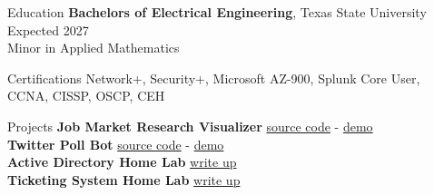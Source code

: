\documentclass{resume} %
\begin{document}

\begin{rSection}{Education}
{\bf Bachelors of Electrical Engineering}, Texas State University \hfill {Expected 2027}\\
Minor in Applied Mathematics \smallskip

\end{rSection}

\begin{rSection}{Certifications}
    Network+, Security+, Microsoft AZ-900, Splunk Core User, CCNA, CISSP, OSCP, CEH
\end{rSection}

\begin{rSection}{Projects}
    {\bf Job Market Research Visualizer} \hfill \href{https://github.com/gutibran}{source code} - \href{https://github.com/gutibran}{demo} \\
    {\bf Twitter Poll Bot} \hfill \href{https://github.com/gutibran}{source code} - \href{https://github.com/gutibran}{demo}  \\
    {\bf Active Directory Home Lab} \hfill \href{https://gutibran.com/blog/setting-up-a-active-directory-home-lab}{write up} \\
    {\bf Ticketing System Home Lab} \hfill \href{https://gutibran.com/blog/setting-up-a-ticketing-system-home-lab}{write up} \\
\end{rSection}
\end{document}

